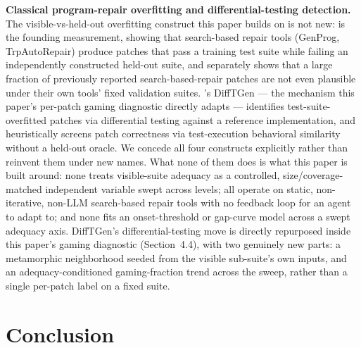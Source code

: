 \documentclass[11pt]{article}
\begin{document}
\textbf{Classical program-repair overfitting and differential-testing detection.} The visible-vs-held-out overfitting construct this paper builds on is not new: \citet{Smith2015Overfitting} is the founding measurement, showing that search-based repair tools (GenProg, TrpAutoRepair) produce patches that pass a training test suite while failing an independently constructed held-out suite, and \citet{Qi2015PatchPlausibility} separately shows that a large fraction of previously reported search-based-repair patches are not even plausible under their own tools' fixed validation suites. \citet{XinReiss2017DiffTGen}'s DiffTGen --- the mechanism this paper's per-patch gaming diagnostic directly adapts --- identifies test-suite-overfitted patches via differential testing against a reference implementation, and \citet{Xiong2018PatchSim} heuristically screens patch correctness via test-execution behavioral similarity without a held-out oracle. We concede all four constructs explicitly rather than reinvent them under new names. What none of them does is what this paper is built around: none treats visible-suite adequacy as a controlled, size/coverage-matched independent variable swept across levels; all operate on static, non-iterative, non-LLM search-based repair tools with no feedback loop for an agent to adapt to; and none fits an onset-threshold or gap-curve model across a swept adequacy axis. DiffTGen's differential-testing move is directly repurposed inside this paper's gaming diagnostic (Section~4.4), with two genuinely new parts: a metamorphic neighborhood seeded from the visible sub-suite's own inputs, and an adequacy-conditioned gaming-fraction trend across the sweep, rather than a single per-patch label on a fixed suite.

\section{Conclusion}
\end{document}
